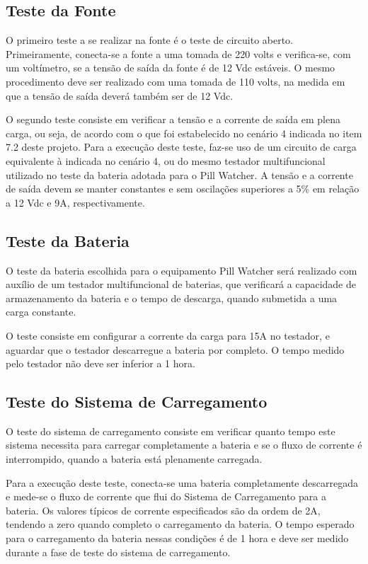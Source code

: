 \subsection{Teste da Fonte}
O primeiro teste a se realizar na fonte é o teste de circuito aberto. Primeiramente, conecta-se a fonte a uma tomada de 220 volts e verifica-se, com um voltímetro, se a tensão de saída da fonte é de 12 Vdc estáveis. O mesmo procedimento deve ser realizado com uma tomada de 110 volts, na medida em que a tensão de saída deverá também ser de 12 Vdc.

O segundo teste consiste em verificar a tensão e a corrente de saída em plena carga, ou seja, de acordo com o que foi estabelecido no cenário 4 indicada no item 7.2 deste projeto. Para a execução deste teste, faz-se uso de um circuito de carga equivalente à indicada no cenário 4, ou do mesmo testador multifuncional utilizado no teste da bateria adotada para o Pill Watcher. A tensão e a corrente de saída devem se manter constantes e sem oscilações superiores a 5\% em relação a 12 Vdc e 9A, respectivamente.

\subsection{Teste da Bateria}
O teste da bateria escolhida para o equipamento Pill Watcher será realizado com auxílio de um testador multifuncional de baterias, que verificará a capacidade de armazenamento da bateria e o tempo de descarga, quando submetida a uma carga constante.

O teste consiste em configurar a corrente da carga para 15A no testador, e aguardar que o testador descarregue a bateria por completo. O tempo medido pelo testador não deve ser inferior a 1 hora.

\subsection{Teste do Sistema de Carregamento}
O teste do sistema de carregamento consiste em verificar quanto tempo este sistema necessita para carregar completamente a bateria e se o fluxo de corrente é interrompido, quando a bateria está plenamente carregada. 

Para a execução deste teste, conecta-se uma bateria completamente descarregada e mede-se o fluxo de corrente que flui do Sistema de Carregamento para a bateria. Os valores típicos de corrente especificados são da ordem de 2A, tendendo a zero quando completo o carregamento da bateria. O tempo esperado para o carregamento da bateria nessas condições é de 1 hora e deve ser medido durante a fase de teste do sistema de carregamento.

